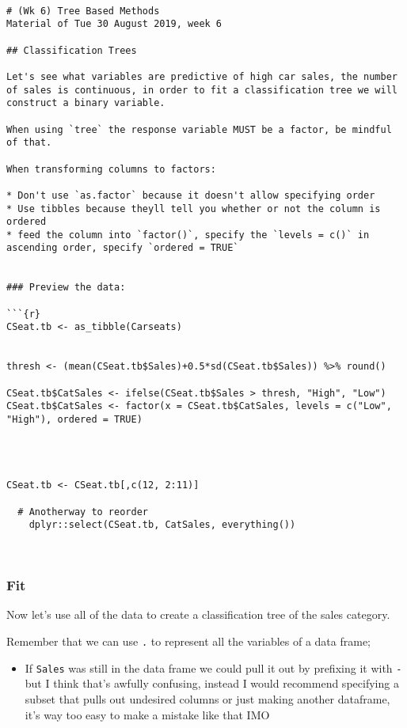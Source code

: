 \documentclass[
]{article}
\newcommand{\passthrough}[1]{#1}
\providecommand{\tightlist}{%
  \setlength{\itemsep}{0pt}\setlength{\parskip}{0pt}}
\begin{document}
\begin{lstlisting}

# (Wk 6) Tree Based Methods
Material of Tue 30 August 2019, week 6

## Classification Trees

Let's see what variables are predictive of high car sales, the number of sales is continuous, in order to fit a classification tree we will construct a binary variable.

When using `tree` the response variable MUST be a factor, be mindful of that.

When transforming columns to factors:

* Don't use `as.factor` because it doesn't allow specifying order
* Use tibbles because theyll tell you whether or not the column is ordered
* feed the column into `factor()`, specify the `levels = c()` in ascending order, specify `ordered = TRUE`


### Preview the data:

```{r}
CSeat.tb <- as_tibble(Carseats)


thresh <- (mean(CSeat.tb$Sales)+0.5*sd(CSeat.tb$Sales)) %>% round()

CSeat.tb$CatSales <- ifelse(CSeat.tb$Sales > thresh, "High", "Low")
CSeat.tb$CatSales <- factor(x = CSeat.tb$CatSales, levels = c("Low", "High"), ordered = TRUE)




CSeat.tb <- CSeat.tb[,c(12, 2:11)]
    
  # Anotherway to reorder
    dplyr::select(CSeat.tb, CatSales, everything())
    
    
\end{lstlisting}

\hypertarget{fit}{%
\subsubsection{Fit}\label{fit}}

Now let's use all of the data to create a classification tree of the
sales category.

Remember that we can use \passthrough{\lstinline!.!} to represent all
the variables of a data frame;

\begin{itemize}
\tightlist
\item
  If \passthrough{\lstinline!Sales!} was still in the data frame we
  could pull it out by prefixing it with \passthrough{\lstinline!-!} but
  I think that's awfully confusing, instead I would recommend specifying
  a subset that pulls out undesired columns or just making another
  dataframe, it's way too easy to make a mistake like that IMO
\end{itemize}
\end{document}
